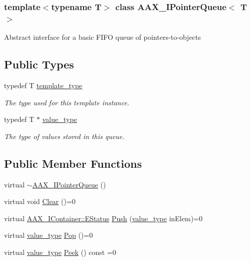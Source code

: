 \subsubsection*{template$<$typename T$>$\newline
class A\+A\+X\+\_\+\+I\+Pointer\+Queue$<$ T $>$}

Abstract interface for a basic F\+I\+FO queue of pointers-\/to-\/objects \subsection*{Public Types}
\begin{DoxyCompactItemize}
\item 
typedef T \mbox{\hyperlink{a01861_ae37a600f078ca0ee6f24b9f45aadc254}{template\+\_\+type}}
\begin{DoxyCompactList}\small\item\em The type used for this template instance. \end{DoxyCompactList}\item 
typedef T $\ast$ \mbox{\hyperlink{a01861_a2d28a2dffe8dc2b7fe218c41b46734e9}{value\+\_\+type}}
\begin{DoxyCompactList}\small\item\em The type of values stored in this queue. \end{DoxyCompactList}\end{DoxyCompactItemize}
\subsection*{Public Member Functions}
\begin{DoxyCompactItemize}
\item 
virtual \mbox{\hyperlink{a01861_a6e5e9c6bc4f527d35506236dd41a093a}{$\sim$\+A\+A\+X\+\_\+\+I\+Pointer\+Queue}} ()
\item 
virtual void \mbox{\hyperlink{a01861_a42bdf5794a2481d0ae3f294fd8f8203e}{Clear}} ()=0
\item 
virtual \mbox{\hyperlink{a01785_aea020100f0b06636ce7cb25c2fdb0af7}{A\+A\+X\+\_\+\+I\+Container\+::\+E\+Status}} \mbox{\hyperlink{a01861_a6f8185d83cac520021bbca7054c57d38}{Push}} (\mbox{\hyperlink{a01861_a2d28a2dffe8dc2b7fe218c41b46734e9}{value\+\_\+type}} in\+Elem)=0
\item 
virtual \mbox{\hyperlink{a01861_a2d28a2dffe8dc2b7fe218c41b46734e9}{value\+\_\+type}} \mbox{\hyperlink{a01861_a49990f21819f0f4493183ea0770d4125}{Pop}} ()=0
\item 
virtual \mbox{\hyperlink{a01861_a2d28a2dffe8dc2b7fe218c41b46734e9}{value\+\_\+type}} \mbox{\hyperlink{a01861_a005cd2626fb8db4d5d708f255b48a0be}{Peek}} () const =0
\end{DoxyCompactItemize}


